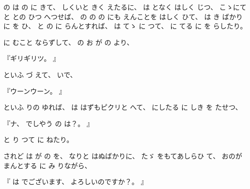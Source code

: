 
の
は
の
に
きて、
%
しくいと
きく
えたるに、
%
は
となく
はしく
じつ、
%
こゝにて
と
との
ひつ
へつせば、
%
の
の
の
にも
えんことを
はしく
ひて、
%
は
き
ばかりに
を
ひ、
%
と
の
に
らんとすれば、
%
は
てゝ
に
つて、
%
に
てる
に
を
らしたり。

に
むこと
ならずして、
%
の
お
が
の
より、

『ギリギリツ。
』

といふ
づ
えて、
%
いで、

『ウーンウーン。
』

といふ
りの
ゆれば、
%
は
はずもピクリと
へて、
%
にしたる
に
しき
を
たせつ、

『ナ、
%
でしやう
の
は？。
』

と
り
つて
に
ねたり。

されど
は
が
の
を、
%
なりと
はぬばかりに、
%
たゞ
をもてあしらひ
て、
%
おのが
まんとする
に
み
りながら、

『
は%
でございます、
%
よろしいのですか？。
』


